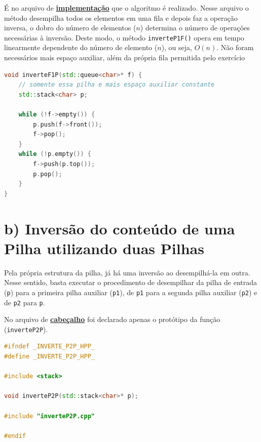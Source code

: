 \documentclass[
  brazilian,
  paper=a4,
  oneside  ,captions=tableheading
]{scrbook}
\newcommand{\passthrough}[1]{#1}
\begin{document}
É no arquivo de
\href{https://github.com/ecostadelle/lista_pilhas_filas/blob/main/include/inverteF1P.cpp}{\textbf{implementação}}
que o algoritmo é realizado. Nesse arquivo o método desempilha todos os
elementos em uma fila e depois faz a operação inversa, o dobro do número
de elementos (\(n\)) determina o número de operações necessárias à
inversão. Deste modo, o método \passthrough{\lstinline!inverteP1F()!}
opera em tempo linearmente dependente do número de elemento (\(n\)), ou
seja, \(O(n)\). Não foram necessários mais espaço auxiliar, além da
própria fila permitida pelo exercício

\begin{lstlisting}[language={C++}]
void inverteF1P(std::queue<char>* f) { 
    // somente essa pilha e mais espaço auxiliar constante
    std::stack<char> p;

    while (!f->empty()) {
        p.push(f->front());
        f->pop();
    }
    while (!p.empty()) {
        f->push(p.top());
        p.pop();
    }
}
\end{lstlisting}

\hypertarget{b-inversuxe3o-do-conteuxfado-de-uma-pilha-utilizando-duas-pilhas}{%
\section{b) Inversão do conteúdo de uma Pilha utilizando duas
Pilhas}\label{b-inversuxe3o-do-conteuxfado-de-uma-pilha-utilizando-duas-pilhas}}

Pela própria estrutura da pilha, já há uma inversão ao desempilhá-la em
outra. Nesse sentido, basta executar o procedimento de desempilhar da
pilha de entrada (\passthrough{\lstinline!p!}) para a primeira pilha
auxiliar (\passthrough{\lstinline!p1!}), de \passthrough{\lstinline!p1!}
para a segunda pilha auxiliar (\passthrough{\lstinline!p2!}) e de
\passthrough{\lstinline!p2!} para \passthrough{\lstinline!p!}.

No arquivo de
\href{https://github.com/ecostadelle/lista_pilhas_filas/blob/main/include/inverteP2P.hpp}{\textbf{cabeçalho}}
foi declarado apenas o protótipo da função
(\passthrough{\lstinline!inverteP2P!}).

\begin{lstlisting}[language={C++}]
#ifndef _INVERTE_P2P_HPP_
#define _INVERTE_P2P_HPP_

#include <stack>

void inverteP2P(std::stack<char>* p);

#include "inverteP2P.cpp"

#endif
\end{lstlisting}
\end{document}
